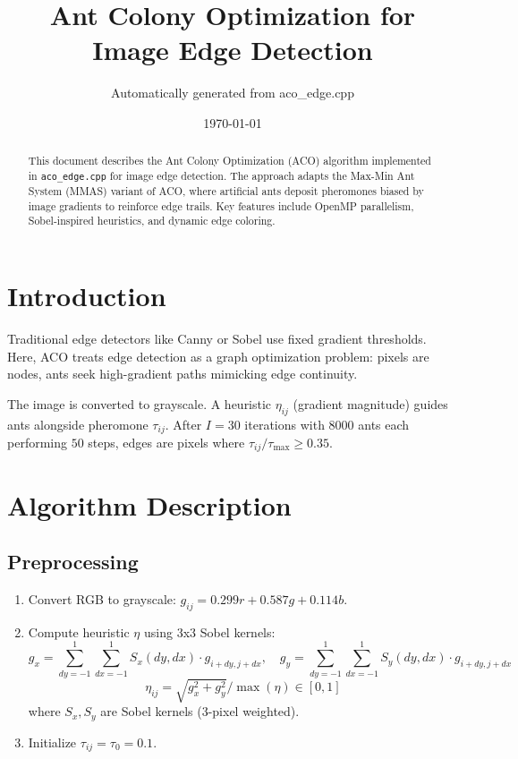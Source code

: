 \documentclass[11pt,a4paper]{article}
\title{Ant Colony Optimization for Image Edge Detection}
\author{Automatically generated from aco\_edge.cpp}
\date{\today}
\begin{document}
\maketitle

\begin{abstract}
This document describes the Ant Colony Optimization (ACO) algorithm implemented in \texttt{aco\_edge.cpp} for image edge detection. The approach adapts the Max-Min Ant System (MMAS) variant of ACO, where artificial ants deposit pheromones biased by image gradients to reinforce edge trails. Key features include OpenMP parallelism, Sobel-inspired heuristics, and dynamic edge coloring.
\end{abstract}

\section{Introduction}
Traditional edge detectors like Canny or Sobel use fixed gradient thresholds. Here, ACO treats edge detection as a graph optimization problem: pixels are nodes, ants seek high-gradient paths mimicking edge continuity.

The image is converted to grayscale. A heuristic $\eta_{ij}$ (gradient magnitude) guides ants alongside pheromone $\tau_{ij}$. After $I=30$ iterations with $8000$ ants each performing $50$ steps, edges are pixels where $\tau_{ij}/\tau_{\max} \geq 0.35$.

\section{Algorithm Description}

\subsection{Preprocessing}
\begin{enumerate}
\item Convert RGB to grayscale: $g_{ij} = 0.299r + 0.587g + 0.114b$.
\item Compute heuristic $\eta$ using 3x3 Sobel kernels:
\[
g_x = \sum_{dy=-1}^{1} \sum_{dx=-1}^{1} S_x(dy,dx) \cdot g_{i+dy,j+dx}, \quad
g_y = \sum_{dy=-1}^{1} \sum_{dx=-1}^{1} S_y(dy,dx) \cdot g_{i+dy,j+dx}
\]
\[
\eta_{ij} = \sqrt{g_x^2 + g_y^2} / \max(\eta) \in [0,1]
\]
where $S_x,S_y$ are Sobel kernels (3-pixel weighted).
\item Initialize $\tau_{ij} = \tau_0 = 0.1$.
\end{enumerate}
\end{document}
